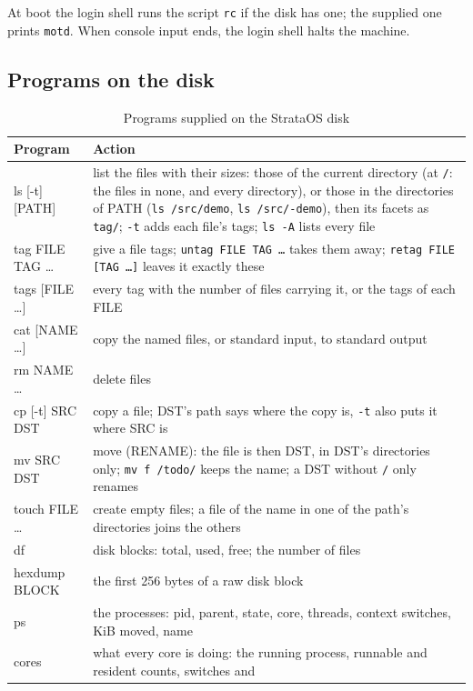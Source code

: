 At boot the login shell runs the script \texttt{rc} if the disk has one; the supplied one prints
\texttt{motd}. When console input ends, the login shell halts the machine.

\subsection{Programs on the disk}

\begin{table}[htbp]
\centering\small
\caption{Programs supplied on the StrataOS disk}\label{tab:os-progs}
\begin{tabularx}{\linewidth}{@{}>{\ttfamily}l X@{}}
\toprule
\textrm{\bfseries Program} & \textbf{Action}\\\midrule
ls [-t] [PATH] & list the files with their sizes: those of the current directory (at
  \texttt{/}: the files in none, and every directory), or those in the directories of PATH
  (\texttt{ls /src/demo}, \texttt{ls /src/-demo}), then its facets as \texttt{tag/};
  \texttt{-t} adds each file's tags; \texttt{ls -A} lists every file\\
tag FILE TAG \ldots & give a file tags; \texttt{untag FILE TAG \ldots} takes them away;
  \texttt{retag FILE [TAG \ldots]} leaves it exactly these\\
tags [FILE \ldots] & every tag with the number of files carrying it, or the tags of each FILE\\
cat [NAME \ldots] & copy the named files, or standard input, to standard output\\
rm NAME \ldots & delete files\\
cp [-t] SRC DST & copy a file; DST's path says where the copy is, \texttt{-t} also puts it where SRC
  is\\
mv SRC DST & move (RENAME): the file is then DST, in DST's directories only; \texttt{mv f /todo/}
  keeps the name; a DST without \texttt{/} only renames\\
touch FILE \ldots & create empty files; a file of the name in one of the path's directories joins
  the others\\
df & disk blocks: total, used, free; the number of files\\
hexdump BLOCK & the first 256 bytes of a raw disk block\\
ps & the processes: pid, parent, state, core, threads, context switches, KiB moved, name\\
cores & what every core is doing: the running process, runnable and resident counts, switches and

\end{tabularx}
\end{table}
